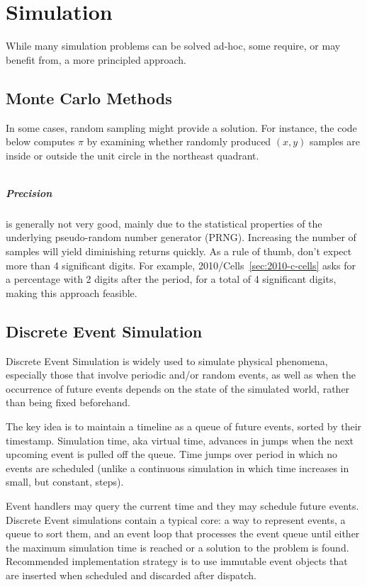 \chapter{Simulation}

While many simulation problems can be solved ad-hoc, some require, or may benefit
from, a more principled approach.

\section{Monte Carlo Methods}

In some cases, random sampling might provide a solution.
For instance, the code below computes $\pi$ by examining whether
randomly produced $(x, y)$ samples are inside or outside the unit 
circle in the northeast quadrant.

\inputminted[fontsize=\footnotesize,linenos=true]{java}{code/Pi.java}

\paragraph{Precision} is generally not very good, mainly due to the  
statistical properties of the underlying pseudo-random number generator (PRNG).
Increasing the number of samples will yield diminishing returns quickly.
As a rule of thumb, don't expect more than 4 significant digits.
For example, 2010/Cells~\ref{sec:2010-c-cells} asks for a percentage with 2 digits after the
period, for a total of 4 significant digits, making this approach feasible.

\section{Discrete Event Simulation}

Discrete Event Simulation is widely used to simulate physical phenomena, especially
those that involve periodic and/or random events, as well as when the occurrence of
future events depends on the state of the simulated world, rather than being fixed
beforehand.

The key idea is to maintain a timeline as a queue of future events, sorted
by their timestamp.  Simulation time, aka virtual time, advances in jumps when
the next upcoming event is pulled off the queue.  Time jumps over period in which
no events are scheduled (unlike a continuous simulation in which time increases
in small, but constant, steps).

Event handlers may query the current time and they may schedule future events.
Discrete Event simulations contain a typical core: a way to represent events, 
a queue to sort them, and an event loop that processes the event queue until
either the maximum simulation time is reached or a solution to the problem is found.
Recommended implementation strategy is to use immutable event objects that are
inserted when scheduled and discarded after dispatch.

